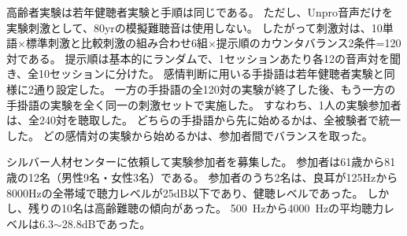 高齢者実験は若年健聴者実験と手順は同じである。
ただし、Unpro音声だけを実験刺激として、80yrの模擬難聴音は使用しない。
したがって刺激対は、10単語$\times$標準刺激と比較刺激の組み合わせ6組$\times$提示順のカウンタバランス2条件=120対である。
提示順は基本的にランダムで、1セッションあたり各12の音声対を聞き、全10セッションに分けた。
感情判断に用いる手掛語は若年健聴者実験と同様に2通り設定した。
一方の手掛語の全120対の実験が終了した後、もう一方の手掛語の実験を全く同一の刺激セットで実施した。
すなわち、1人の実験参加者は、全240対を聴取した。
どちらの手掛語から先に始めるかは、全被験者で統一した。
どの感情対の実験から始めるかは、参加者間でバランスを取った。

シルバー人材センターに依頼して実験参加者を募集した。
参加者は61歳から81歳の12名（男性9名・女性3名）である。
参加者のうち2名は、良耳が125Hzから8000Hzの全帯域で聴力レベルが25dB以下であり、健聴レベルであった。
しかし、残りの10名は高齢難聴の傾向があった。
500~Hzから4000~Hzの平均聴力レベルは6.3$\sim$28.8dBであった。


